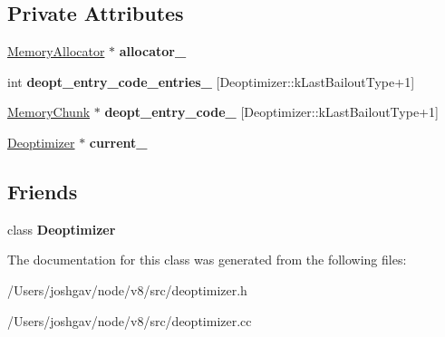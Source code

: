 \subsection*{Private Attributes}
\begin{DoxyCompactItemize}
\item 
\hyperlink{classv8_1_1internal_1_1_memory_allocator}{Memory\+Allocator} $\ast$ {\bfseries allocator\+\_\+}\hypertarget{classv8_1_1internal_1_1_deoptimizer_data_aa654603a37088f24f9a222d8e6e84e7c}{}\label{classv8_1_1internal_1_1_deoptimizer_data_aa654603a37088f24f9a222d8e6e84e7c}

\item 
int {\bfseries deopt\+\_\+entry\+\_\+code\+\_\+entries\+\_\+} \mbox{[}Deoptimizer\+::k\+Last\+Bailout\+Type+1\mbox{]}\hypertarget{classv8_1_1internal_1_1_deoptimizer_data_a77d5c87a7fdbcfde4a55252a07b8069d}{}\label{classv8_1_1internal_1_1_deoptimizer_data_a77d5c87a7fdbcfde4a55252a07b8069d}

\item 
\hyperlink{classv8_1_1internal_1_1_memory_chunk}{Memory\+Chunk} $\ast$ {\bfseries deopt\+\_\+entry\+\_\+code\+\_\+} \mbox{[}Deoptimizer\+::k\+Last\+Bailout\+Type+1\mbox{]}\hypertarget{classv8_1_1internal_1_1_deoptimizer_data_afb2b4a29025c6b5029f01bfaebb8bafc}{}\label{classv8_1_1internal_1_1_deoptimizer_data_afb2b4a29025c6b5029f01bfaebb8bafc}

\item 
\hyperlink{classv8_1_1internal_1_1_deoptimizer}{Deoptimizer} $\ast$ {\bfseries current\+\_\+}\hypertarget{classv8_1_1internal_1_1_deoptimizer_data_a59b7c353b6b63d7be52f1b7466c5223a}{}\label{classv8_1_1internal_1_1_deoptimizer_data_a59b7c353b6b63d7be52f1b7466c5223a}

\end{DoxyCompactItemize}
\subsection*{Friends}
\begin{DoxyCompactItemize}
\item 
class {\bfseries Deoptimizer}\hypertarget{classv8_1_1internal_1_1_deoptimizer_data_aa89911581cd6ded032f998021aef9e5c}{}\label{classv8_1_1internal_1_1_deoptimizer_data_aa89911581cd6ded032f998021aef9e5c}

\end{DoxyCompactItemize}


The documentation for this class was generated from the following files\+:\begin{DoxyCompactItemize}
\item 
/\+Users/joshgav/node/v8/src/deoptimizer.\+h\item 
/\+Users/joshgav/node/v8/src/deoptimizer.\+cc\end{DoxyCompactItemize}
